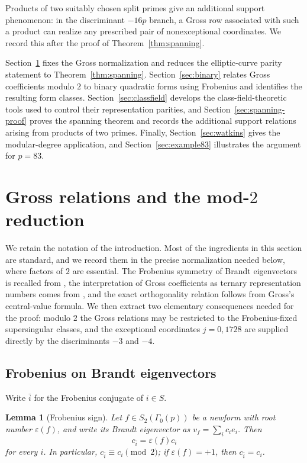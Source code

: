 \documentclass[10pt,a4paper]{amsart}
\newtheorem{lemma}[theorem]{Lemma}
\begin{document}
Products of two suitably chosen split primes give an additional support
phenomenon: in the discriminant $-16p$ branch, a Gross row associated with
such a product can realize any prescribed pair of nonexceptional
coordinates. We record this after the proof of
Theorem~\ref{thm:spanning}.

Section~\ref{sec:gross} fixes the Gross normalization and reduces the
elliptic-curve parity statement to Theorem~\ref{thm:spanning}.
Section~\ref{sec:binary} relates Gross coefficients modulo $2$ to binary
quadratic forms using Frobenius and identifies the resulting form classes.
Section~\ref{sec:classfield} develops the class-field-theoretic tools used
to control their representation parities, and
Section~\ref{sec:spanning-proof} proves the spanning theorem and records
the additional support relations arising from products of two primes.
Finally, Section~\ref{sec:watkins} gives the modular-degree application,
and Section~\ref{sec:example83} illustrates the argument for $p=83$.

\section{Gross relations and the \texorpdfstring{mod-$2$}{mod-2} reduction}\label{sec:gross}

We retain the notation of the introduction. Most of the ingredients in this
section are standard, and we record them in the precise normalization needed
below, where factors of $2$ are essential. The Frobenius symmetry of Brandt
eigenvectors is recalled from \cite[Propositions~18--19]{KazalickiKohen2017},
the interpretation of Gross coefficients as ternary representation numbers
comes from \cite[Section~12, in particular Proposition~12.9]{Gross1987},
and the exact orthogonality relation follows from Gross's central-value
formula. We then extract two elementary consequences needed for the proof:
modulo $2$ the Gross relations may be restricted to the Frobenius-fixed
supersingular classes, and the exceptional coordinates $j=0,1728$ are
supplied directly by the discriminants $-3$ and $-4$.

\subsection{Frobenius on Brandt eigenvectors}

Write $\bar i$ for the Frobenius conjugate of $i\in S$.

\begin{lemma}[Frobenius sign]\label{lem:frob-sign}
Let $f\in S_2(\Gamma_0(p))$ be a newform with root number $\varepsilon(f)$, and write its Brandt eigenvector as $v_f=\sum_i c_i e_i$.  Then
\[
  c_{\bar i}=\varepsilon(f)c_i
\]
for every $i$.  In particular, $c_{\bar i}\equiv c_i\pmod2$; if $\varepsilon(f)=+1$, then $c_{\bar i}=c_i$.
\end{lemma}
\end{document}
